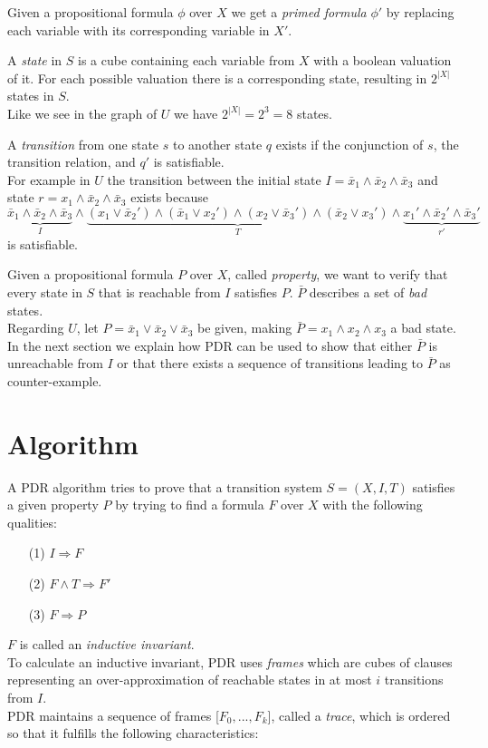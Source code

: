 \documentclass[11pt, a4paper, BCOR=10mm, ngerman]{scrbook}
\begin{document}
Given a propositional formula $\phi$ over $X$ we get a \textsl{primed formula} $\phi'$ by replacing each variable with its corresponding variable in $X'$. \par

A \textsl{state} in $S$ is a cube containing each variable from $X$ with a boolean valuation of it. For each possible valuation there is a corresponding state, resulting in $2^{|X|}$ states in $S$. \\
Like we see in the graph of $U$ we have $2^{|X|} = 2^3 = 8$ states.

A \textsl{transition} from one state $s$ to another state $q$ exists if the conjunction of $s$, the transition relation, and $q'$ is satisfiable.\\ For example in $U$ the transition between the initial state $I = \bar x_1 \land \bar x_2 \land \bar x_3$ and state $r = x_1 \land \bar x_2 \land \bar x_3$ exists because
\begin{equation*}
\underbrace{\bar x_1 \land \bar x_2 \land \bar x_3}_{I} \land \underbrace{(x_1 \lor \bar x_2' ) \land ( \bar x_1 \lor x_2') \land (x_2 \lor \bar x_3') \land ( \bar x_2 \lor x_3')}_T \land \underbrace{x_1' \land \bar x_2' \land \bar x_3'}_{r'}
\end{equation*}
is satisfiable.\par

Given a propositional formula $P$ over $X$, called \textsl{property}, we want
to verify that every state in $S$ that is reachable from
$I$ satisfies $P$. $\bar{P}$ describes a set of \textsl{bad} states.  \\ 
Regarding $U$, let $P = \bar x_1 \lor \bar x_2 \lor \bar x_3$ be given, making $\bar P = x_1 \land x_2 \land x_3$ a bad state. \\ 
In the next section we explain how PDR can be used to show that either $\bar P$ is unreachable from $I$ or that there exists a sequence of transitions leading to $\bar P$ as counter-example.

\section{Algorithm}
A PDR algorithm tries to prove that a transition system $S = (X, I, T)$ satisfies a given property $P$ by trying to find a formula $F$ over $X$ with the following qualities:
\begin{itemize}
\item[(1)] $I \Rightarrow F$
\item[(2)] $F \land T \Rightarrow F'$
\item[(3)] $F \Rightarrow P$
\end{itemize}
$F$ is called an \textsl{inductive invariant}. \\ 
To calculate an inductive invariant, PDR uses \textsl{frames} which are cubes of clauses representing an over-approximation of reachable states in at most $i$ transitions from $I$. \\
PDR maintains a sequence of frames [$F_0, ..., F_k$], called a \textsl{trace}, which is ordered so that it fulfills the following characteristics: 
\end{document}
